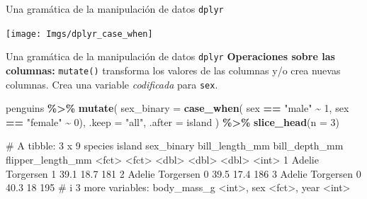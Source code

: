 \documentclass[
  ignorenonframetext,
  aspectratio=169]{beamer}
\newenvironment{Shaded}{\begin{snugshade}}{\end{snugshade}}
\newcommand{\AttributeTok}[1]{\textcolor[rgb]{0.13,0.29,0.53}{#1}}
\newcommand{\DecValTok}[1]{\textcolor[rgb]{0.00,0.00,0.81}{#1}}
\newcommand{\FunctionTok}[1]{\textcolor[rgb]{0.13,0.29,0.53}{\textbf{#1}}}
\newcommand{\NormalTok}[1]{#1}
\newcommand{\SpecialCharTok}[1]{\textcolor[rgb]{0.81,0.36,0.00}{\textbf{#1}}}
\newcommand{\StringTok}[1]{\textcolor[rgb]{0.31,0.60,0.02}{#1}}
\let\oldverbatim\verbatim
\let\endoldverbatim\endverbatim
\renewenvironment{verbatim}{\tiny\oldverbatim}{\endoldverbatim}
\begin{document}
\begin{frame}{Una gramática de la manipulación de datos \texttt{dplyr}}
\label{una-gramuxe1tica-de-la-manipulaciuxf3n-de-datos-dplyr-23}
\begin{center}\texttt{[image: Imgs/dplyr\_case\_when]} \end{center}
\end{frame}

\begin{frame}[fragile]{Una gramática de la manipulación de datos
\texttt{dplyr}}
\label{una-gramuxe1tica-de-la-manipulaciuxf3n-de-datos-dplyr-24}
\textbf{Operaciones sobre las columnas:} \texttt{mutate()} transforma
los valores de las columnas y/o crea nuevas columnas. Crea una variable
\emph{codificada} para \texttt{sex}.

\begin{Shaded}
\begin{Highlighting}[]
\NormalTok{penguins }\SpecialCharTok{\%\textgreater{}\%} 
  \FunctionTok{mutate}\NormalTok{(}
    \AttributeTok{sex\_binary =} \FunctionTok{case\_when}\NormalTok{(}
\NormalTok{      sex }\SpecialCharTok{==} \StringTok{"male"} \SpecialCharTok{\textasciitilde{}} \DecValTok{1}\NormalTok{,}
\NormalTok{      sex }\SpecialCharTok{==} \StringTok{"female"} \SpecialCharTok{\textasciitilde{}} \DecValTok{0}\NormalTok{),}
    \AttributeTok{.keep =} \StringTok{"all"}\NormalTok{, }\AttributeTok{.after =}\NormalTok{ island}
\NormalTok{  ) }\SpecialCharTok{\%\textgreater{}\%} 
  \FunctionTok{slice\_head}\NormalTok{(}\AttributeTok{n =} \DecValTok{3}\NormalTok{)}
\end{Highlighting}
\end{Shaded}

\begin{verbatim}
# A tibble: 3 x 9
  species island    sex_binary bill_length_mm bill_depth_mm flipper_length_mm
  <fct>   <fct>          <dbl>          <dbl>         <dbl>             <int>
1 Adelie  Torgersen          1           39.1          18.7               181
2 Adelie  Torgersen          0           39.5          17.4               186
3 Adelie  Torgersen          0           40.3          18                 195
# i 3 more variables: body_mass_g <int>, sex <fct>, year <int>
\end{verbatim}
\end{frame}
\end{document}
